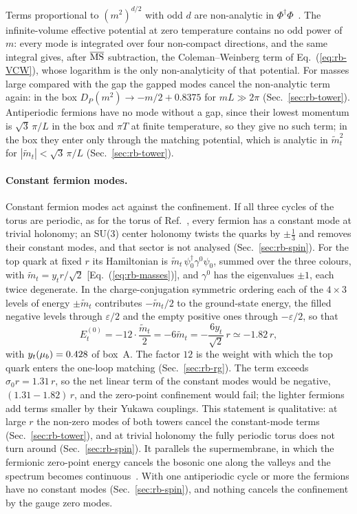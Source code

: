 Terms proportional to $(m^2)^{d/2}$ with odd $d$ are non-analytic in $\Phi^\dagger\Phi$~\cite{Barbon:2006us}.
The infinite-volume effective potential at zero temperature contains no odd power of $m$: every mode is integrated over four non-compact directions, and the same integral gives, after $\overline{\mathrm{MS}}$ subtraction, the Coleman--Weinberg term of Eq.~(\ref{eq:rb-VCW}), whose logarithm is the only non-analyticity of that potential.
For masses large compared with the gap the gapped modes cancel the non-analytic term again: in the box $D_P(m^2)\to-m/2+0.8375$ for $mL\gg2\pi$ (Sec.~\ref{sec:rb-tower}). %
Antiperiodic fermions have no mode without a gap, since their lowest momentum is $\sqrt3\,\pi/L$ in the box and $\pi T$ at finite temperature, so they give no such term; in the box they enter only through the matching potential, which is analytic in $\tilde m_t^2$ for $|\tilde m_t|<\sqrt3\,\pi/L$ (Sec.~\ref{sec:rb-tower}).

\paragraph{Constant fermion modes.}
Constant fermion modes act against the confinement.
If all three cycles of the torus are periodic, as for the torus of Ref.~\cite{Fornal:2026qfq}, every fermion has a constant mode at trivial holonomy; an SU(3) center holonomy twists the quarks by $\pm\frac13$ and removes their constant modes, and that sector is not analysed (Sec.~\ref{sec:rb-spin}). %
For the top quark at fixed $r$ its Hamiltonian is $\tilde m_t\,\psi_0^\dagger\gamma^0\psi_0$, summed over the three colours, with $\tilde m_t=y_tr/\sqrt2$ [Eq.~(\ref{eq:rb-masses})], and $\gamma^0$ has the eigenvalues $\pm1$, each twice degenerate.
In the charge-conjugation symmetric ordering each of the $4\times3$ levels of energy $\pm\tilde m_t$ contributes $-\tilde m_t/2$ to the ground-state energy, the filled negative levels through $\varepsilon/2$ and the empty positive ones through $-\varepsilon/2$, so that
\begin{equation}
E_t^{(0)}=-12\cdot\frac{\tilde m_t}{2}=-6\tilde m_t=-\frac{6y_t}{\sqrt2}\,r\simeq-1.82\,r,
\label{eq:v11-top-zero}
\end{equation}
with $y_t(\mu_b)=0.428$ of box~A. %
The factor $12$ is the weight with which the top quark enters the one-loop matching (Sec.~\ref{sec:rb-rg}).
The term exceeds $\sigma_0r=1.31\,r$, so the net linear term of the constant modes would be negative, $(1.31-1.82)\,r$, and the zero-point confinement would fail; the lighter fermions add terms smaller by their Yukawa couplings. %
This statement is qualitative: at large $r$ the non-zero modes of both towers cancel the constant-mode terms (Sec.~\ref{sec:rb-tower}), and at trivial holonomy the fully periodic torus does not turn around (Sec.~\ref{sec:rb-spin}).
It parallels the supermembrane, in which the fermionic zero-point energy cancels the bosonic one along the valleys and the spectrum becomes continuous~\cite{deWit:1988xki}.
With one antiperiodic cycle or more the fermions have no constant modes (Sec.~\ref{sec:rb-spin}), and nothing cancels the confinement by the gauge zero modes.


